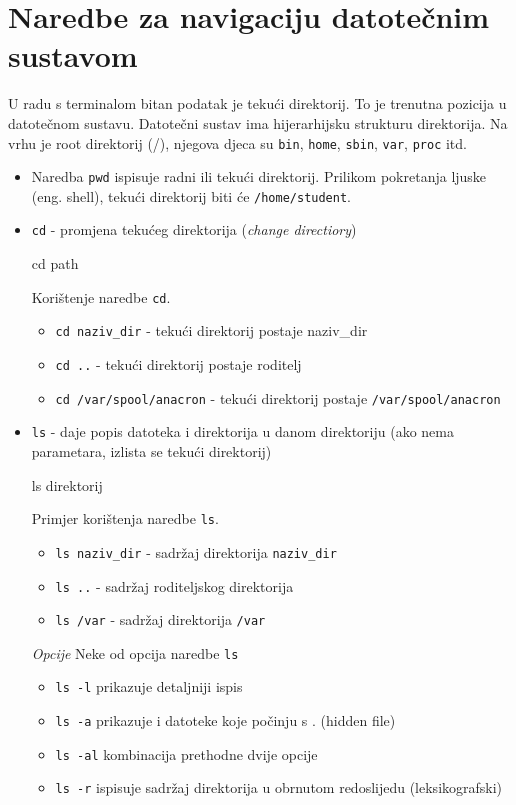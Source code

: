 \section{Naredbe za navigaciju datotečnim sustavom}
U radu s terminalom bitan podatak je tekući direktorij. To je trenutna pozicija u datotečnom sustavu.
Datotečni sustav ima hijerarhijsku strukturu direktorija. Na vrhu je root direktorij (/), njegova djeca su \texttt{bin}, \texttt{home}, \texttt{sbin}, \texttt{var}, \texttt{proc} itd.
\begin{itemize}
\item Naredba \texttt{pwd} ispisuje radni ili tekući direktorij. Prilikom pokretanja ljuske (eng. shell), tekući direktorij biti će \texttt{/home/student}.
\item \texttt{cd} - promjena tekućeg direktorija (\textit{change directiory})
\begin{prototip}
cd path
\end{prototip}

\begin{primjer} Korištenje naredbe \texttt{cd}.
\begin{itemize}
\item \texttt{cd naziv\_dir} - tekući direktorij postaje naziv\_dir
\item \texttt{cd ..} - tekući direktorij postaje roditelj
\item \texttt{cd /var/spool/anacron} - tekući direktorij postaje \texttt{/var/spool/anacron}
\end{itemize}
\end{primjer}

\item \texttt{ls} - daje popis datoteka i direktorija u danom direktoriju (ako nema parametara, izlista se tekući direktorij)
\begin{prototip}
ls direktorij
\end{prototip}
\begin{primjer} Primjer korištenja naredbe \texttt{ls}.
\begin{itemize}
 \item \texttt{ls naziv\_dir} - sadržaj direktorija \texttt{naziv\_dir}
\item \texttt{ls ..} - sadržaj roditeljskog direktorija
\item \texttt{ls /var} - sadržaj direktorija \texttt{/var}
\end{itemize}
 \textit{Opcije}
\newline Neke od opcija naredbe \texttt{ls}
\begin{itemize}
\item \texttt{ls -l} prikazuje detaljniji ispis
 \item \texttt{ls -a} prikazuje i datoteke koje počinju s . (hidden file)
\item \texttt{ls -al} kombinacija prethodne dvije opcije
\item \texttt{ls -r} ispisuje sadržaj direktorija u obrnutom redoslijedu (leksikografski)
\end{itemize}
\end{primjer}


\end{itemize}
